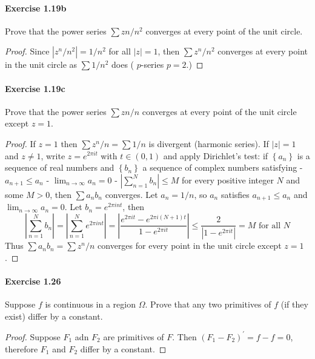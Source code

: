\documentclass{article}
\begin{document}
\paragraph{Exercise 1.19b} Prove that the power series $\sum zn/n^2$ converges at every point of the unit circle.
\begin{proof}
    Since $\left|z^n / n^2\right|=1 / n^2$ for all $|z|=1$, then $\sum z^n / n^2$ converges at every point in the unit circle as $\sum 1 / n^2$ does ( $p$-series $p=2$.)
\end{proof}



\paragraph{Exercise 1.19c} Prove that the power series $\sum zn/n$ converges at every point of the unit circle except $z = 1$.
\begin{proof}
    If $z=1$ then $\sum z^n / n=\sum 1 / n$ is divergent (harmonic series). If $|z|=1$ and $z \neq 1$, write $z=e^{2 \pi i t}$ with $t \in(0,1)$ and apply Dirichlet's test: if $\left\{a_n\right\}$ is a sequence of real numbers and $\left\{b_n\right\}$ a sequence of complex numbers satisfying
- $a_{n+1} \leq a_n$
- $\lim _{n \rightarrow \infty} a_n=0$
- $\left|\sum_{n=1}^N b_n\right| \leq M$ for every positive integer $N$ and some $M>0$,
then $\sum a_n b_n$ converges. Let $a_n=1 / n$, so $a_n$ satisfies $a_{n+1} \leq a_n$ and $\lim _{n \rightarrow \infty} a_n=0$. Let $b_n=e^{2 \pi i n t}$, then
$$
\left|\sum_{n=1}^N b_n\right|=\left|\sum_{n=1}^N e^{2 \pi i n t}\right|=\left|\frac{e^{2 \pi i t}-e^{2 \pi i(N+1) t}}{1-e^{2 \pi i t}}\right| \leq \frac{2}{\left|1-e^{2 \pi i t}\right|}=M \text { for all } N
$$
Thus $\sum a_n b_n=\sum z^n / n$ converges for every point in the unit circle except $z=1$.
\end{proof}


\paragraph{Exercise 1.26} Suppose $f$ is continuous in a region $\Omega$. Prove that any two primitives of $f$ (if they exist) differ by a constant.
\begin{proof}
    Suppose $F_1$ adn $F_2$ are primitives of $F$. Then $(F_1-F_2)^\prime = f - f = 0$, therefore $F_1$ and $F_2$ differ by a constant. 
\end{proof}
\end{document}
